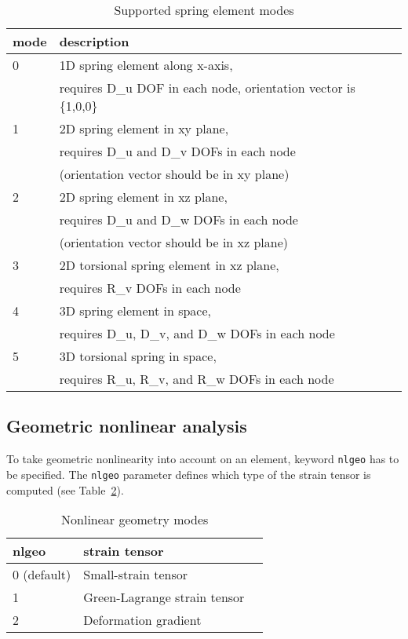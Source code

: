 \documentclass[a4paper]{article}
\newcommand{\param}[1]{\texttt{#1}} %
\begin{document}
\begin{table}
  \centering
  \begin{tabular}{lll}
    \hline
    mode & description\\
    \hline
    0 & 1D spring element along x-axis,\\
    & requires D\_u DOF in each node, orientation vector is \{1,0,0\}\\
    1 & 2D spring element in xy plane,\\
    & requires D\_u and D\_v DOFs in each node \\
    & (orientation vector should be in xy plane)\\
    2 & 2D spring element in xz plane,\\
    & requires D\_u and D\_w DOFs in each node \\
    & (orientation vector should be in xz plane)\\
    3 & 2D torsional spring element in xz plane,\\
    & requires R\_v DOFs in each node\\
    4 & 3D spring element in space,\\
    & requires D\_u, D\_v, and D\_w DOFs in each node\\
    5 & 3D torsional spring in space,\\
    & requires R\_u, R\_v, and R\_w DOFs in each node\\
    \hline
  \end{tabular}
  \caption{Supported spring element modes } \label{spring_mode_table}
\end{table}

\clearpage
\subsection{Geometric nonlinear analysis}
To take geometric nonlinearity into account on an element, keyword \param{nlgeo} has to be specified. The \param{nlgeo} parameter defines which type of the strain tensor is computed (see Table~\ref{strain_tensor_table}).
\begin{table}
  \centering
  \begin{tabular}{lll}
    \hline
    nlgeo & strain tensor\\
    \hline
    0 (default) & Small-strain tensor\\
    1 & Green-Lagrange strain tensor\\
    2 & Deformation gradient\\
    \hline
  \end{tabular}
  \caption{Nonlinear geometry modes} \label{strain_tensor_table}
\end{table}
\end{document}
